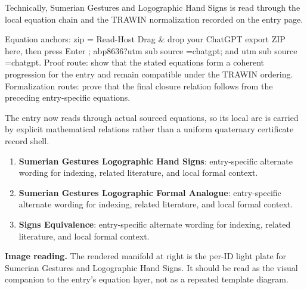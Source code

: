 Technically, Sumerian Gestures and Logographic Hand Signs is read through the local equation chain and the TRAWIN normalization recorded on the entry page.

Equation anchors: zip = Read-Host Drag \& drop your ChatGPT export ZIP here, then press Enter ; abp8636?utm sub source =chatgpt; and utm sub source =chatgpt. Proof route: show that the stated equations form a coherent progression for the entry and remain compatible under the TRAWIN ordering. Formalization route: prove that the final closure relation follows from the preceding entry-specific equations.

The entry now reads through actual sourced equations, so its local arc is carried by explicit mathematical relations rather than a uniform quaternary certificate record shell.
\endgroup

\begin{enumerate}[leftmargin=1.6em,itemsep=6pt,topsep=4pt]
\item \textbf{Sumerian Gestures Logographic Hand Signs}: entry-specific alternate wording for indexing, related literature, and local formal context.
\item \textbf{Sumerian Gestures Logographic Formal Analogue}: entry-specific alternate wording for indexing, related literature, and local formal context.
\item \textbf{Signs Equivalence}: entry-specific alternate wording for indexing, related literature, and local formal context.
\end{enumerate}

\begin{samepage}
\noindent\begin{minipage}[t]{0.45\linewidth}
\vspace{0pt}
\raggedright
\scriptsize\textbf{Image reading.} The rendered manifold at right is the per-ID light plate for Sumerian Gestures and Logographic Hand Signs. It should be read as the visual companion to the entry's equation layer, not as a repeated template diagram.\par
\end{minipage}\hfill
\begin{minipage}[t]{0.53\linewidth}
\vspace*{-0.10in}
\raggedright
{}
\end{minipage}
\end{samepage}

